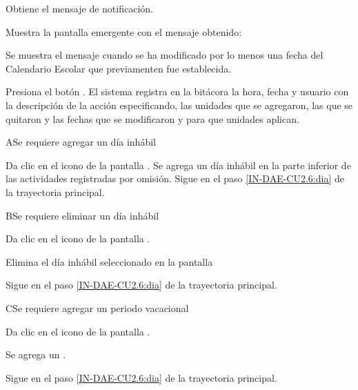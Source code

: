 \begin{UCtrayectoria}
\UCpaso Obtiene el mensaje  de notificación. 

\UCpaso  \label{IN-DAE-CU2.6:noti} Muestra la pantalla emergente  con el mensaje obtenido:

	\Titem Se muestra el mensaje  cuando se ha modificado por lo menos una fecha del Calendario Escolar que previamenten fue establecida.  

 \UCpaso[\UCactor]Presiona el botón . 
\UCpaso El sistema registra en la bitácora la hora, fecha y usuario con la descripción de la acción especificando, las unidades que se agregaron, las que se quitaron y las fechas que se modificaron y para que unidades aplican.
\end{UCtrayectoria}






\begin{UCtrayectoriaA}{A}{Se requiere agregar un día inhábil}
	
	\UCpaso [\UCactor] 	Da clic en el icono \IUAdd de la pantalla .
	\UCpaso Se agrega un día inhábil en la parte inferior de las actividades registradas por omisión. 	
	\UCpaso Sigue en el paso \ref{IN-DAE-CU2.6:dia}  de la trayectoria principal.
	
\end{UCtrayectoriaA}


\begin{UCtrayectoriaA}{B}{Se requiere eliminar un día inhábil}
	
	\UCpaso [\UCactor] 	Da clic en el icono \IUMenos de la pantalla .
	
	\UCpaso Elimina el día inhábil seleccionado en la pantalla  
	
	\UCpaso Sigue en el paso \ref{IN-DAE-CU2.6:dia}  de la trayectoria principal.
	
\end{UCtrayectoriaA}


\begin{UCtrayectoriaA}{C}{Se requiere agregar un periodo vacacional}
	
	\UCpaso [\UCactor] 	Da clic en el icono \IUAdd de la pantalla .
	
	\UCpaso Se agrega un .
	
	\UCpaso Sigue en el paso \ref{IN-DAE-CU2.6:dia}  de la trayectoria principal.
	
\end{UCtrayectoriaA}

